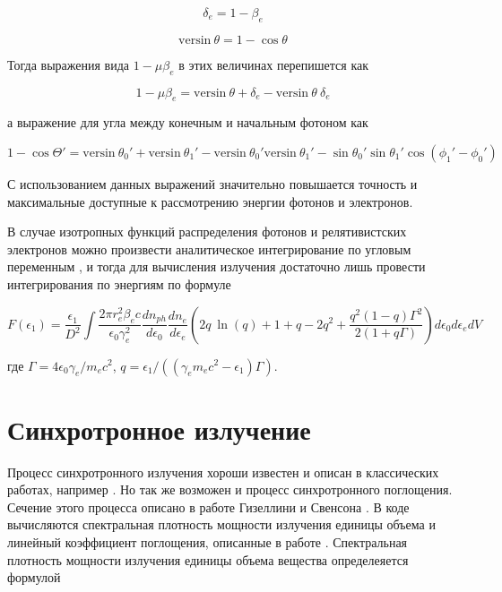 \begin{equation}
	\delta_e = 1 - \beta_e
\end{equation}

\begin{equation}
	\text{versin}~\theta = 1 - \cos \theta
\end{equation}

Тогда выражения вида $1 - \mu \beta_e$ в этих величинах перепишется как

\begin{equation}
	1 - \mu \beta_e =\text{versin}~\theta + \delta_e - \text{versin}~\theta~\delta_e
\end{equation}

а выражение для угла между конечным и начальным фотоном как

\begin{equation}
	1 - \cos \Theta' = \text{versin}~\theta_0' + \text{versin}~\theta_1' - \text{versin}~ \theta_0' \text{versin}~\theta_1' - \sin \theta_0'\sin \theta_1' \cos(\phi_1'-\phi_0')
\end{equation}

С использованием данных выражений значительно повышается точность и максимальные доступные к рассмотрению энергии фотонов и электронов.

В случае изотропных функций распределения фотонов и релятивистских электронов можно произвести аналитическое интегрирование по угловым переменным \cite{JonesCompton, BykovUvarov2000}, и тогда для вычисления излучения достаточно лишь провести интегрирования по энергиям по формуле

\begin{equation}
F(\epsilon_1)=\frac{\epsilon_1}{D^2}\int \frac{2 \pi r_e^2 \beta_e c}{\epsilon_0 \gamma_e^2} \frac{dn_{ph}}{d\epsilon_0}\frac{dn_e}{d\epsilon_e}(2 q~ \ln(q)+1+q-2q^2+\frac{q^2(1-q)\Gamma^2}{2(1+q\Gamma)})d\epsilon_0 d\epsilon_e dV
\end{equation}

где $\Gamma=4\epsilon_0\gamma_e/m_e c^2$, $q=\epsilon_1/((\gamma_e m_e c^2-\epsilon_1)\Gamma)$.

\section{Синхротронное излучение}\label{SynchrotronFormulae}
Процесс синхротронного излучения хороши известен и описан в классических работах, например \cite{Ginzburg1975}. Но так же возможен и процесс синхротронного поглощения. Сечение этого процесса описано в работе Гизеллини и Свенсона \cite{Ghisellini1991}. В коде вычисляются спектральная плотность мощности излучения единицы объема и линейный коэффициент поглощения, описанные в работе \cite{Ghisellini}. Спектральная плотность мощности излучения единицы объема вещества определеяется формулой

